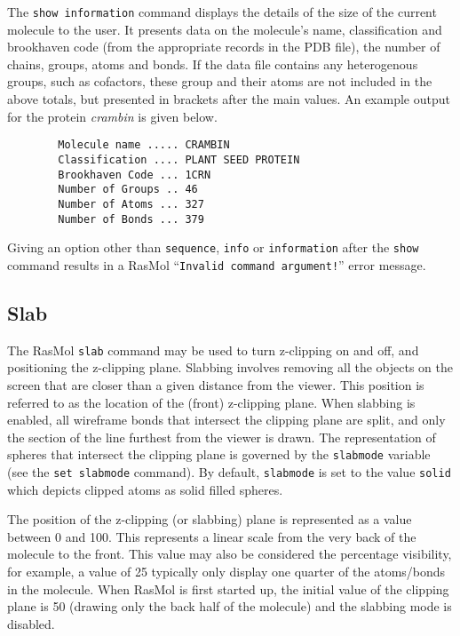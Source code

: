 The {\tt show information} command displays the details of the size of the
current molecule to the user. It presents data on the molecule's name, 
classification and brookhaven code (from the appropriate records in the PDB
file), the number of chains, groups, atoms and bonds. If the data file
contains any heterogenous groups, such as cofactors, these group and their
atoms are not included in the above totals, but presented in brackets after
the main values. An example output for the protein {\em crambin} is given
below.

\begin{verbatim}
        Molecule name ..... CRAMBIN
        Classification .... PLANT SEED PROTEIN
        Brookhaven Code ... 1CRN
        Number of Groups .. 46
        Number of Atoms ... 327
        Number of Bonds ... 379
\end{verbatim}

Giving an option other than {\tt sequence}, {\tt info} or {\tt information}
after the {\tt show} command results in a RasMol ``{\tt Invalid command 
argument!}'' error message.


\subsection{Slab}
\label{CSlab}

The RasMol {\tt slab} command may be used to turn z-clipping on and off,
and positioning the z-clipping plane. Slabbing involves removing all the
objects on the screen that are closer than a given distance from the viewer.
This position is referred to as the location of the (front) z-clipping plane.
When slabbing is enabled, all wireframe bonds that intersect the clipping
plane are split, and only the section of the line furthest from the viewer is
drawn. The representation of spheres that intersect the clipping plane is
governed by the {\tt slabmode} variable (see the {\tt set~slabmode} command).
By default, {\tt slabmode} is set to the value {\tt solid} which depicts 
clipped atoms as solid filled spheres.

The position of the z-clipping (or slabbing) plane is represented as a 
value between 0 and 100. This represents a linear scale from the very back 
of the molecule to the front. This value may also be considered the 
percentage visibility, for example, a value of 25 typically only display 
one quarter of the atoms/bonds in the molecule. When RasMol is first started 
up, the initial value of the clipping plane is 50 (drawing only the back 
half of the molecule) and the slabbing mode is disabled.

